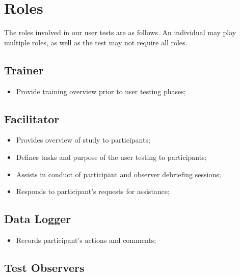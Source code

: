 
\section{Roles}
\label{sec:sec004}

The roles involved in our user tests are as follows. An individual may play multiple roles, as well as the test may not require all roles.

\subsection{Trainer}

\begin{itemize}
\item Provide training overview prior to user testing phases;
\end{itemize}

\subsection{Facilitator}

\begin{itemize}
\item Provides overview of study to participants;
\item Defines tasks and purpose of the user testing to participants;
\item Assists in conduct of participant and observer debriefing sessions;
\item Responds to participant's requests for assistance;
\end{itemize}

\subsection{Data Logger}

\begin{itemize}
\item Records participant's actions and comments;
\end{itemize}

\subsection{Test Observers}


